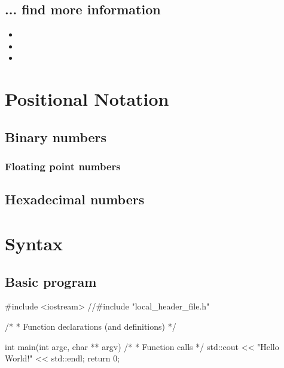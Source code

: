 \documentclass[10pt,a4paper]{scrartcl}
\begin{document}
\begin{multicols*}{2}
\subsection{... find more information}

\begin{itemize}
\item {}
\item {}
\item {}
\end{itemize}
\fi

\glsaddall

\printnoidxglossary[sort=def,title={Terms},nonumberlist=true,nopostdot=true]

\section{Positional Notation}

\subsection{Binary numbers}

\subsubsection{Floating point numbers}

\subsection{Hexadecimal numbers}

\section{Syntax}

\subsection{Basic program}

\begin{TPCpp}
#include <iostream>
//#include "local_header_file.h"

/*
 * Function declarations (and definitions)
 */

int main(int argc, char ** argv)
{
	  /*
	   * Function calls
	   */
    std::cout << "Hello World!" << std::endl;
    return 0;
}


\end{TPCpp}
\end{multicols*}
\end{document}
